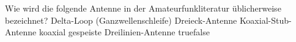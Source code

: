     {Wie wird die folgende Antenne in der Amateurfunkliteratur üblicherweise bezeichnet?}
    {Delta-Loop (Ganzwellenschleife)}
    {Dreieck-Antenne}
    {Koaxial-Stub-Antenne}
    {koaxial gespeiste Dreilinien-Antenne}
    {true}{false}